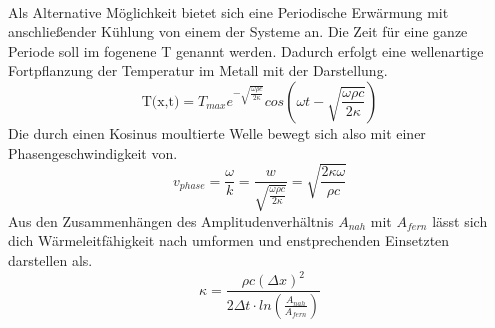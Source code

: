 \\
\newline
Als Alternative Möglichkeit bietet sich eine Periodische Erwärmung mit anschließender Kühlung von einem der Systeme an.
Die Zeit für eine ganze Periode soll im fogenene T genannt werden.
Dadurch erfolgt eine wellenartige Fortpflanzung der Temperatur im Metall mit der Darstellung.
\begin{equation}
    \label{eqn:nqe}
    \text{T(x,t)}=T_{max}e^{- \sqrt{\frac{\omega \rho c}{2 \kappa}}}cos \left (\omega t - \sqrt{\frac{\omega \rho c}{2 \kappa}} \right)
\end{equation}
Die durch einen Kosinus moultierte Welle bewegt sich also mit einer Phasengeschwindigkeit von.
\begin{equation}
    \label{eqn:v}
    v_{phase}= \frac{\omega}{k} = \frac{w}{\sqrt{\frac{\omega \rho c}{2 \kappa}}} = \sqrt{\frac{2\kappa \omega}{\rho c}}
\end{equation}
Aus den Zusammenhängen des Amplitudenverhältnis $A_{nah}$ mit $A_{fern}$ lässt sich dich Wärmeleitfähigkeit nach umformen
und enstprechenden Einsetzten darstellen als.
\begin{equation}
    \label{eqn:kappa}
    \kappa = \frac{\rho c \left ( \Delta x \right )^2}{2 \Delta t \cdot ln \left (\frac{A_{nah}}{A_{fern}}\right)}
\end{equation}